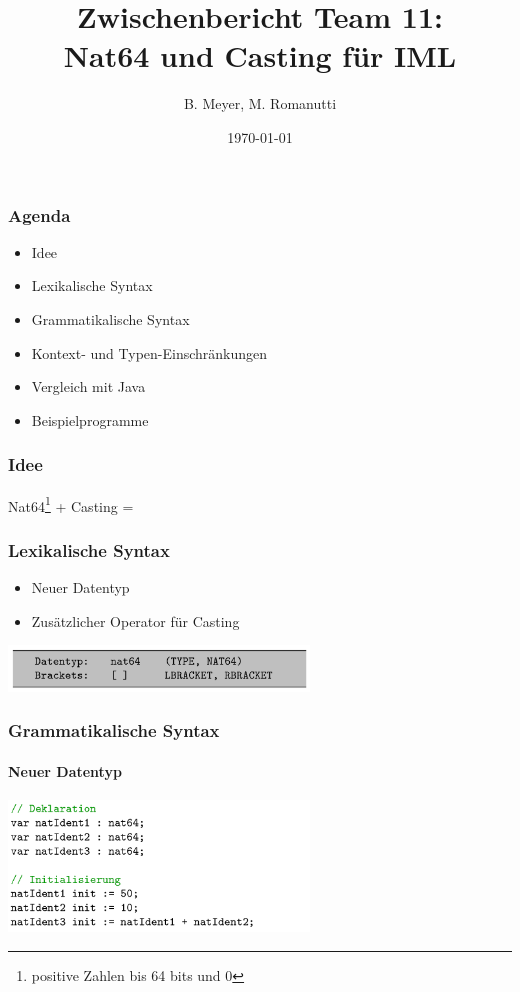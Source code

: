\documentclass{beamer}
\title[Nat64 und Casting für IML]{Zwischenbericht Team 11: \protect\\ Nat64 und Casting für IML}
\author{B. Meyer, M. Romanutti}
\date{\today}
\institute{FHNW}
\begin{document}
    \begin{frame}[plain]
        \maketitle
    \end{frame}

    \begin{frame}
        \frametitle{Agenda}
        \begin{itemize}
            \item Idee
            \item Lexikalische Syntax
            \item Grammatikalische Syntax
            \item Kontext- und Typen-Einschränkungen
            \item Vergleich mit Java
            \item Beispielprogramme
        \end{itemize}

    \end{frame}

    \begin{frame}
        \frametitle{Idee}
        \centering
        Nat64\footnote{positive Zahlen bis 64 bits und 0} + Casting = \faRocket
    \end{frame}

    \begin{frame}
        \frametitle{Lexikalische Syntax}
        \begin{itemize}
            \item Neuer Datentyp
            \item Zusätzlicher Operator für Casting
        \end{itemize}
        \vspace{30}
        {\hspace{15}\includegraphics[width=8cm]{listing_1.png}}

    \end{frame}

    \begin{frame}
        \frametitle{Grammatikalische Syntax}
        \framesubtitle{Neuer Datentyp}
        {\includegraphics[width=8cm]{listing_2.png}}
    \end{frame}
\end{document}
